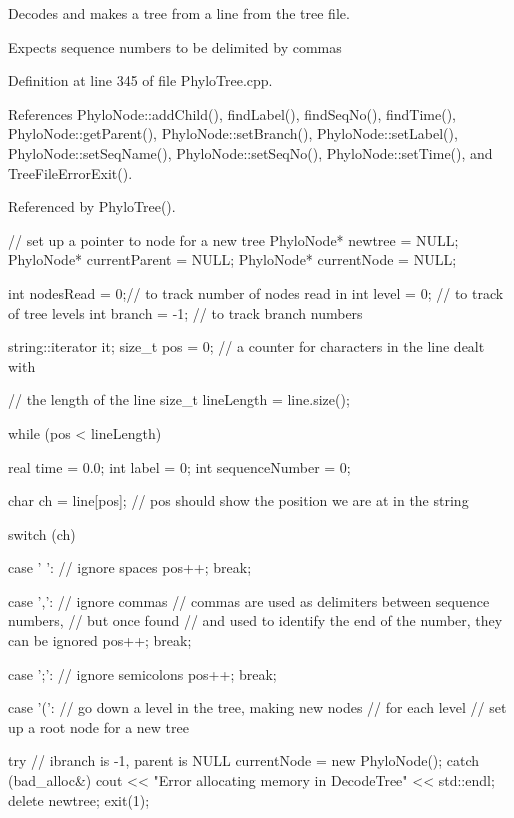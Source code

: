 \-Decodes and makes a tree from a line from the tree file. 

\-Expects sequence numbers to be delimited by commas 

\-Definition at line 345 of file \-Phylo\-Tree.\-cpp.



\-References \-Phylo\-Node\-::add\-Child(), find\-Label(), find\-Seq\-No(), find\-Time(), \-Phylo\-Node\-::get\-Parent(), \-Phylo\-Node\-::set\-Branch(), \-Phylo\-Node\-::set\-Label(), \-Phylo\-Node\-::set\-Seq\-Name(), \-Phylo\-Node\-::set\-Seq\-No(), \-Phylo\-Node\-::set\-Time(), and \-Tree\-File\-Error\-Exit().



\-Referenced by \-Phylo\-Tree().


\begin{DoxyCode}
{

  // set up a pointer to node for a new tree
  PhyloNode* newtree = NULL;
  PhyloNode* currentParent = NULL;
  PhyloNode* currentNode = NULL;

  int nodesRead = 0;// to track number of nodes read in
  int level = 0;    // to track of tree levels
  int branch = -1;  // to track branch numbers

  string::iterator it;
  size_t pos = 0;   // a counter for characters in the line dealt with

                    // the length of the line
  size_t lineLength = line.size();

  while (pos < lineLength)
  {

    real time = 0.0;
    int label = 0;
    int sequenceNumber = 0;

    char ch = line[pos];
    // pos should show the position we are at in the string

    switch (ch)
    {
      case ' ':     // ignore spaces
        pos++;
        break;

      case ',':     // ignore commas
        // commas are used as delimiters between sequence numbers, 
        // but once found
        // and used to identify the end of the number, they can be ignored
        pos++;
        break;

      case ';':     // ignore semicolons
        pos++;
        break;

      case '(':     // go down a level in the tree, making new nodes 
                    // for each level
        // set up a root node for a new tree

        try
        {
                    // ibranch is -1, parent is NULL
          currentNode = new PhyloNode();
        }
        catch (bad_alloc&)
        {
          cout << "Error allocating memory in DecodeTree" << std::endl;
          delete newtree;
          exit(1);
        }

}}}
\end{DoxyCode}
